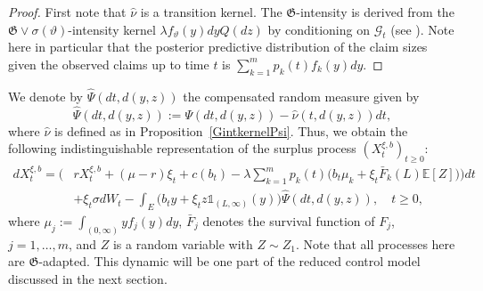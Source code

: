 \documentclass[reqno, 11pt]{amsart}%
\newcommand{\Eop}{\mathbb{E}}
\theoremstyle{definition}
\numberwithin{equation}{section} \numberwithin{theorem}{section}
\begin{document}
\begin{proof}
First note that $\hat{\nu}$ is a transition kernel. The  ${\mathfrak G}$-intensity is derived from the ${\mathfrak G} \vee \sigma(\vartheta)$-intensity kernel $\lambda f_\vartheta(y)dyQ(dz)$ by conditioning on ${\mathcal G}_t$ (see \cite{bre}). Note here in particular that the posterior predictive distribution of the claim sizes given the observed claims up to time $t$ is $\sum_{k=1}^m p_k(t)f_k(y)dy$.
\end{proof}	
	

We denote by $\hat{\Psi}(dt, d(y,z))$ the compensated random measure given by
\begin{equation}\label{Psihat}
\hat{\Psi}(dt, d(y,z)) :=  \Psi(dt, d(y,z)) - \hat\nu(t,d(y,z))dt,
\end{equation}
where $\hat\nu$ is defined as in Proposition~\ref{GintkernelPsi}.
Thus, we obtain the following indistinguishable representation of the surplus process $(X^{\xi,b}_t)_{t\ge0}$:
\begin{equation}\label{wealth}
\begin{aligned}
d X^{\xi,b}_t = \bigg(&r X_t^{\xi,b} + (\mu-r)\xi_t + c(b_t) - \lambda\sum_{k=1}^m p_k(t)\big(b_t\mu_k + \xi_t \bar F_k(L)\Eop[Z]\big)\bigg)dt  \\
& + \xi_t\sigma dW_t - \int_E \big(b_t y + \xi_t z \mathds{1}_{(L,\infty)}(y)\big) \hat{\Psi}(dt, d(y,z)),\quad t\ge0,
\end{aligned}
\end{equation}
where $\mu_j:=\int_{(0,\infty)} y f_j(y)dy$, $\bar F_j$ denotes the survival function of $F_j$, $j=1,\ldots,m$, and $Z$ is a random variable with $Z\sim Z_1$. Note that all processes here are ${\mathfrak G}$-adapted.
This dynamic will be one part of the reduced control model discussed in the next section. 
\end{document}
